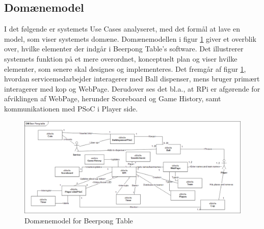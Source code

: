 \documentclass[Arkitektur/System_main.tex]{subfiles}
\begin{document}
\subsection{Domænemodel} \label{sec:domainmodel}

I det følgende er systemets Use Cases analyseret, med det formål at lave en model, som viser systemets domæne. Domænemodellen i figur \ref{fig:domain_model} giver et overblik over, hvilke elementer der indgår i Beerpong Table's software. Det illustrerer systemets funktion på et mere overordnet, konceptuelt plan og viser hvilke elementer, som senere skal designes og implementeres. Det fremgår af figur \ref{fig:domain_model}, hvordan servicemedarbejder interagerer med Ball dispenser, mens bruger primært interagerer med kop og WebPage. Derudover ses det bl.a., at RPi er afgørende for afviklingen af WebPage, herunder Scoreboard og Game History, samt kommunikationen med PSoC i Player side. 

\begin{figure}[H]
    \centering
    \includegraphics[angle=90, scale=0.7]{Arkitektur/Softwarearkitektur/Domaenemodel/graphics/domain_model.png}
    \caption{Domænemodel for Beerpong Table}
    \label{fig:domain_model}
\end{figure}
\end{document}
